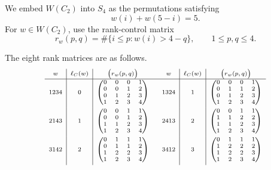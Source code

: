\documentclass[12pt]{article}
\begin{document}
We embed $W(C_2)$ into $S_4$ as the permutations satisfying
\[
    w(i)+w(5-i)=5.
\]
For $w\in W(C_2)$, use the rank-control matrix
\[
    r_w(p,q)=\#\{i\le p:w(i)>4-q\},
    \qquad
    1\le p,q\le 4.
\]

The eight rank matrices are as follows. 
\[
\scriptsize
\begin{array}{c|c|c@{\qquad}c|c|c}
    w & \ell_C(w) & \bigl(r_w(p,q)\bigr)
    &
    w & \ell_C(w) & \bigl(r_w(p,q)\bigr)
    \\
    \hline
    1234 & 0 &
    \begin{pmatrix}
        0&0&0&1\\
        0&0&1&2\\
        0&1&2&3\\
        1&2&3&4
    \end{pmatrix}
    &
    1324 & 1 &
    \begin{pmatrix}
        0&0&0&1\\
        0&1&1&2\\
        0&1&2&3\\
        1&2&3&4
    \end{pmatrix}
    \\[5mm]

    2143 & 1 &
    \begin{pmatrix}
        0&0&1&1\\
        0&0&1&2\\
        1&1&2&3\\
        1&2&3&4
    \end{pmatrix}
    &
    2413 & 2 &
    \begin{pmatrix}
        0&0&1&1\\
        1&1&2&2\\
        1&1&2&3\\
        1&2&3&4
    \end{pmatrix}
    \\[5mm]

    3142 & 2 &
    \begin{pmatrix}
        0&1&1&1\\
        0&1&1&2\\
        1&2&2&3\\
        1&2&3&4
    \end{pmatrix}
    &
    3412 & 3 &
    \begin{pmatrix}
        0&1&1&1\\
        1&2&2&2\\
        1&2&2&3\\
        1&2&3&4
    \end{pmatrix}
    \\[5mm]


\end{array}\]
\end{document}
